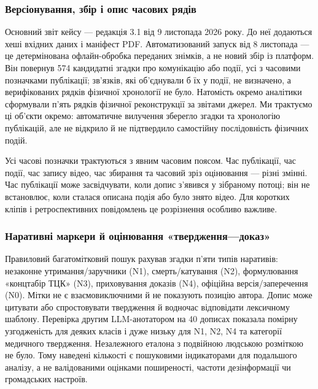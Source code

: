 \subsubsection{Версіонування, збір і опис часових рядів}

Основний звіт кейсу — редакція 3.1 від 9 листопада 2026 року. До неї додаються хеші вхідних даних і маніфест PDF. Автоматизований запуск від 8 листопада — це детермінована офлайн-обробка переданих знімків, а не новий збір із платформ. Він повернув 574 кандидатні згадки про комунікацію або події, усі з часовими позначками публікації; зв'язків, які об'єднували б їх у події, не визначено, а верифікованих рядків фізичної хронології не було. Натомість окремо аналітики сформували п'ять рядків фізичної реконструкції за звітами джерел. Ми трактуємо ці об'єкти окремо: автоматичне вилучення зберегло згадки та хронологію публікацій, але не відкрило й не підтвердило самостійну послідовність фізичних подій.

Усі часові позначки трактуються з явним часовим поясом. Час публікації, час події, час запису відео, час збирання та часовий зріз оцінювання — різні змінні. Час публікації може засвідчувати, коли допис з'явився у зібраному потоці; він не встановлює, коли сталася описана подія або було знято відео. Для коротких кліпів і ретроспективних повідомлень це розрізнення особливо важливе.

\subsubsection{Наративні маркери й оцінювання «твердження—доказ»}

Правиловий багатомітковий пошук рахував згадки п'яти типів наративів: незаконне утримання/заручники (N1), смерть/катування (N2), формулювання «концтабір ТЦК» (N3), приховування доказів (N4), офіційна версія/заперечення (N0). Мітки не є взаємовиключними й не показують позицію автора. Допис може цитувати або спростовувати твердження й водночас відповідати лексичному шаблону. Перевірка другим LLM-анотатором на 40 дописах показала помірну узгодженість для деяких класів і дуже низьку для N1, N2, N4 та категорії медичного твердження. Незалежного еталона з подвійною людською розміткою не було. Тому наведені кількості є пошуковими індикаторами для подальшого аналізу, а не валідованими оцінками поширеності, частоти дезінформації чи громадських настроїв.

